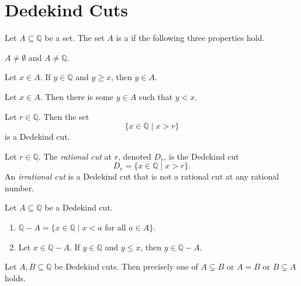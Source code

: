 \section{Dedekind Cuts}
\label{cuts}

\begin{definition} %
	Let $A \subseteq \mathbb{Q}$ be a set. The set $A$ is a \emph{} if the following three properties hold.
	\begin{lenumerate}
		\item $A \neq \emptyset$ and $A \neq \mathbb{Q}$.
		\item Let $x \in A$. If $y \in \mathbb{Q}$ and $y \geq x$, then $y \in A$.
		\item Let $x \in A$. Then there is some $y \in A$ such that $y < x$.
	\end{lenumerate}
\end{definition}

\begin{lemma} %
	Let $r \in \mathbb{Q}$. Then the set
	\[
		\{ x \in \mathbb{Q} \mid x > r \}
	\]
	is a Dedekind cut.
\end{lemma}

\addtocounter{theorem}{1}
\begin{definition} %
	Let $r \in \mathbb{Q}$. The \emph{rational cut} at $r$, denoted $D_{r}$, is the Dedekind cut
	\[
		D_{r} = \{ x \in \mathbb{Q} \mid x > r \}.
	\]
	An \emph{irrational cut} is a Dedekind cut that is not a rational cut at any rational number.
\end{definition}

\begin{lemma} %
	Let $A \subseteq \mathbb{Q}$ be a Dedekind cut.
	\begin{enumerate}
		\item $\mathbb{Q} - A = \{ x \in \mathbb{Q} \mid x < a \text{ for all } a \in A \}$.
		\item Let $x \in \mathbb{Q} - A$. If $y \in \mathbb{Q}$ and $y \leq x$, then $y \in \mathbb{Q} - A$.
	\end{enumerate}
\end{lemma}

\begin{lemma} %
	Let $A, B \subseteq \mathbb{Q}$ be Dedekind cuts. Then precisely one of $A \subsetneq B$ or $A = B$ or $B \subsetneq A$ holds.
\end{lemma}

